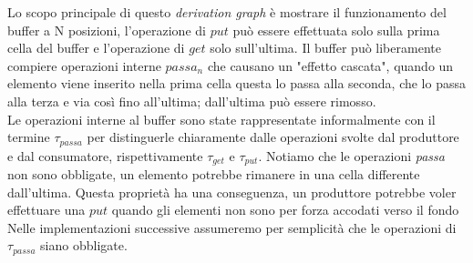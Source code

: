 \documentclass[a4paper]{article}
\begin{document}
Lo scopo principale di questo \textit{derivation graph} è mostrare il funzionamento del buffer a N posizioni, l'operazione di $put$ può essere effettuata solo sulla prima cella del buffer e l'operazione di $get$ solo sull'ultima.
Il buffer può liberamente compiere operazioni interne $passa_n$ che causano un "effetto cascata", quando un elemento viene inserito nella prima cella questa lo passa alla seconda, che lo passa alla terza e via così fino all'ultima; dall'ultima può essere rimosso.\\
Le operazioni interne al buffer sono state rappresentate informalmente con il termine $\tau_{passa}$ per distinguerle chiaramente dalle operazioni svolte dal produttore e dal consumatore, rispettivamente $\tau_{get}$ e $\tau_{put}$.
Notiamo che le operazioni \textit{passa} non sono obbligate, un elemento potrebbe rimanere in una cella differente dall'ultima.
Questa proprietà ha una conseguenza, un produttore potrebbe voler effettuare una $put$ quando gli elementi non sono per forza accodati verso il fondo %
Nelle implementazioni successive assumeremo per semplicità che le operazioni di $\tau_{passa}$ siano obbligate.
\end{document}
